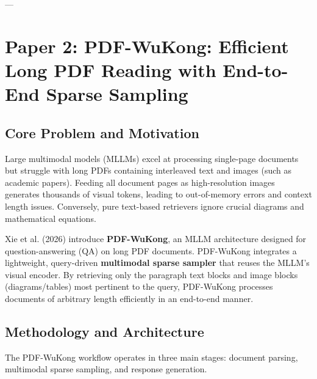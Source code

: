 \documentclass[11pt,a4paper]{article}
\begin{document}
---

\section{Paper 2: PDF-WuKong: Efficient Long PDF Reading with End-to-End Sparse Sampling}
\label{sec:pdf_wukong}

\subsection{Core Problem and Motivation}
Large multimodal models (MLLMs) excel at processing single-page documents but struggle with long PDFs containing interleaved text and images (such as academic papers). Feeding all document pages as high-resolution images generates thousands of visual tokens, leading to out-of-memory errors and context length issues. Conversely, pure text-based retrievers ignore crucial diagrams and mathematical equations.

Xie et al. (2026) introduce \textbf{PDF-WuKong}, an MLLM architecture designed for question-answering (QA) on long PDF documents. PDF-WuKong integrates a lightweight, query-driven \textbf{multimodal sparse sampler} that reuses the MLLM's visual encoder. By retrieving only the paragraph text blocks and image blocks (diagrams/tables) most pertinent to the query, PDF-WuKong processes documents of arbitrary length efficiently in an end-to-end manner.

\subsection{Methodology and Architecture}
The PDF-WuKong workflow operates in three main stages: document parsing, multimodal sparse sampling, and response generation.
\end{document}
